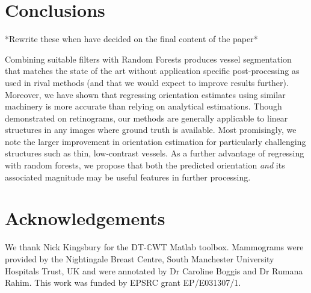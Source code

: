 \documentclass{IEEEtran}
\def\dtcwt{DT-$\mathbb{C}$WT}
\newcommand{\comment}[1]{}
\begin{document}
\section{Conclusions}
\label{conclusions}
*Rewrite these when have decided on the final content of the paper*

Combining suitable filters with Random Forests produces vessel segmentation that matches the state of the art without application specific post-processing as used in rival methods (and that we would expect to improve results further).
Moreover, we have shown that regressing orientation estimates using similar machinery is more accurate than relying on analytical estimations.
Though demonstrated on retinograms, our methods are generally applicable to linear structures in any images where ground truth is available.
Most promisingly, we note the larger improvement in orientation estimation for particularly challenging structures such as thin, low-contrast vessels. As a further advantage of regressing with random forests, we propose that both the predicted orientation \emph{and} its associated magnitude may be useful features in further processing.

\comment{We must, however, take care when building regressors for orientation prediction in order to ensure that angles wrap around the circle correctly.}


\section*{Acknowledgements}
We thank Nick Kingsbury for the \dtcwt{} Matlab toolbox. Mammograms were provided by the Nightingale Breast Centre, South Manchester University Hospitals Trust, UK and were annotated by Dr Caroline Boggis and Dr Rumana Rahim. This work was funded by EPSRC grant EP/E031307/1.

%

%


\end{document}
